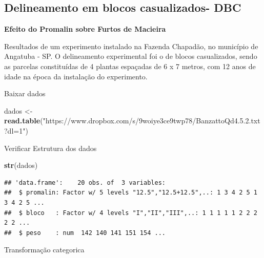 \documentclass[]{book}
\newenvironment{Shaded}{\begin{snugshade}}{\end{snugshade}}
\newcommand{\KeywordTok}[1]{\textcolor[rgb]{0.13,0.29,0.53}{\textbf{#1}}}
\newcommand{\NormalTok}[1]{#1}
\newcommand{\OperatorTok}[1]{\textcolor[rgb]{0.81,0.36,0.00}{\textbf{#1}}}
\newcommand{\StringTok}[1]{\textcolor[rgb]{0.31,0.60,0.02}{#1}}
\begin{document}
\hypertarget{delineamento-em-blocos-casualizados--dbc}{%
\subsection{Delineamento em blocos casualizados- DBC}\label{delineamento-em-blocos-casualizados--dbc}}

\textbf{Efeito do Promalin sobre Furtos de Macieira}

Resultados de um experimento instalado na Fazenda Chapadão, no município de Angatuba - SP. O delineamento experimental foi o de blocos casualizados, sendo as parcelas constituídas de 4 plantas espaçadas de 6 x 7 metros, com 12 anos de idade na época da instalação do experimento.

Baixar dados

\begin{Shaded}
\begin{Highlighting}[]
\NormalTok{dados <-}\StringTok{ }\KeywordTok{read.table}\NormalTok{(}\StringTok{"https://www.dropbox.com/s/9woiye3ce9twp78/BanzattoQd4.5.2.txt?dl=1"}\NormalTok{)}
\end{Highlighting}
\end{Shaded}

Verificar Estrutura dos dados

\begin{Shaded}
\begin{Highlighting}[]
\KeywordTok{str}\NormalTok{(dados)}
\end{Highlighting}
\end{Shaded}

\begin{verbatim}
## 'data.frame':    20 obs. of  3 variables:
##  $ promalin: Factor w/ 5 levels "12.5","12.5+12.5",..: 1 3 4 2 5 1 3 4 2 5 ...
##  $ bloco   : Factor w/ 4 levels "I","II","III",..: 1 1 1 1 1 2 2 2 2 2 ...
##  $ peso    : num  142 140 141 151 154 ...
\end{verbatim}

Transformação categorica

\begin{Shaded}
\end{Shaded}
\end{document}
